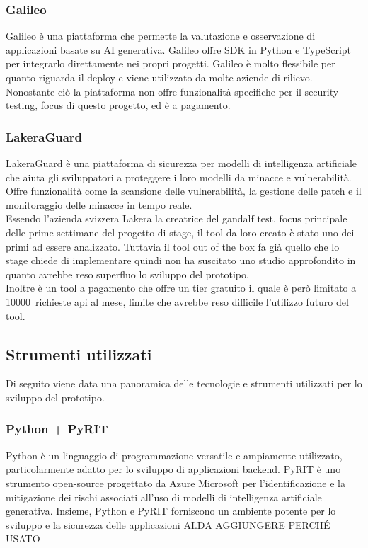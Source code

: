 \subsubsection*{Galileo}
Galileo è una piattaforma che permette la valutazione e osservazione di applicazioni basate su AI generativa. Galileo offre SDK in Python e TypeScript per integrarlo direttamente nei propri progetti. Galileo è molto flessibile per quanto riguarda il deploy e viene utilizzato da molte aziende di rilievo. Nonostante ciò la piattaforma non offre funzionalità specifiche per il security testing, focus di questo progetto, ed è a pagamento.

\subsubsection*{LakeraGuard}
LakeraGuard è una piattaforma di sicurezza per modelli di intelligenza artificiale che aiuta gli sviluppatori a proteggere i loro modelli da minacce e vulnerabilità. Offre funzionalità come la scansione delle vulnerabilità, la gestione delle patch e il monitoraggio delle minacce in tempo reale.\\
Essendo l'azienda svizzera Lakera la creatrice del gandalf test, focus principale delle prime settimane del progetto di stage, il tool da loro creato è stato uno dei primi ad essere analizzato. 
Tuttavia il tool out of the box fa già quello che lo stage chiede di implementare quindi non ha suscitato uno studio approfondito in quanto avrebbe reso superfluo lo sviluppo del prototipo.\\
Inoltre è un tool a pagamento che offre un tier gratuito il quale è però limitato a 10000~richieste \gls{api} al mese, limite che avrebbe reso difficile l'utilizzo futuro del tool.


\subsection{Strumenti utilizzati}
Di seguito viene data una panoramica delle tecnologie e strumenti utilizzati per lo sviluppo del prototipo.

\subsubsection*{Python + PyRIT}
Python è un linguaggio di programmazione versatile e ampiamente utilizzato, particolarmente adatto per lo sviluppo di applicazioni backend. PyRIT è uno strumento open-source progettato da Azure Microsoft per l'identificazione e la mitigazione dei rischi associati all'uso di modelli di intelligenza artificiale generativa. Insieme, Python e PyRIT forniscono un ambiente potente per lo sviluppo e la sicurezza delle applicazioni AI.DA AGGIUNGERE PERCHÉ USATO

